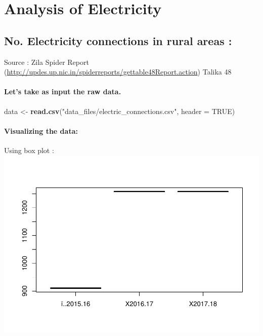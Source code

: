 \documentclass[]{article}
\newenvironment{Shaded}{\begin{snugshade}}{\end{snugshade}}
\newcommand{\KeywordTok}[1]{\textcolor[rgb]{0.13,0.29,0.53}{\textbf{#1}}}
\newcommand{\DataTypeTok}[1]{\textcolor[rgb]{0.13,0.29,0.53}{#1}}
\newcommand{\StringTok}[1]{\textcolor[rgb]{0.31,0.60,0.02}{#1}}
\newcommand{\OtherTok}[1]{\textcolor[rgb]{0.56,0.35,0.01}{#1}}
\newcommand{\NormalTok}[1]{#1}
\let\oldparagraph\paragraph
\renewcommand{\paragraph}[1]{\oldparagraph{#1}\mbox{}}
\begin{document}
\section{Analysis of Electricity}\label{analysis-of-electricity}

\subsection{No. Electricity connections in rural areas
:}\label{no.-electricity-connections-in-rural-areas}

Source : Zila Spider Report
(\url{http://updes.up.nic.in/spiderreports/gettable48Report.action})
Talika 48

\paragraph{Let's take as input the raw
data.}\label{lets-take-as-input-the-raw-data.-3}

\begin{Shaded}
\begin{Highlighting}[]
\NormalTok{data <-}\StringTok{ }\KeywordTok{read.csv}\NormalTok{(}\StringTok{"data_files/electric_connections.csv"}\NormalTok{, }\DataTypeTok{header =} \OtherTok{TRUE}\NormalTok{)}
\end{Highlighting}
\end{Shaded}

\paragraph{Visualizing the data:}\label{visualizing-the-data-3}

Using box plot :
\includegraphics{Report_files/figure-latex/unnamed-chunk-14-1.pdf}
\end{document}
